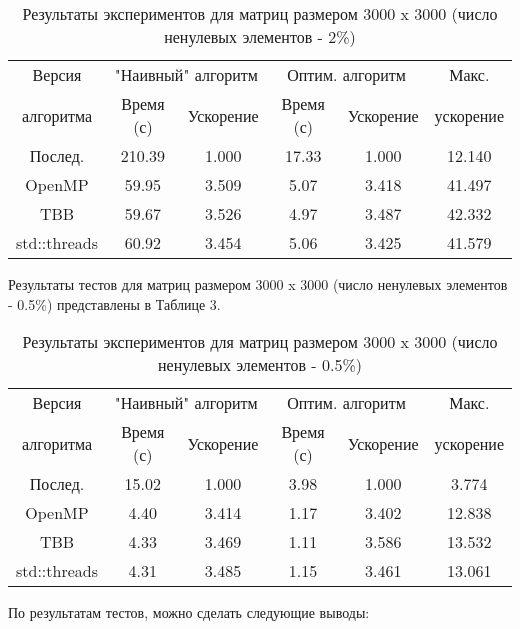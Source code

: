 \documentclass{report}
\begin{document}
	\begin{table}[!h]
		\caption{Результаты экспериментов для матриц размером 3000 x 3000 (число ненулевых элементов - 2\%)}
		\centering
		\begin{tabular}{|c|c|c|c|c|c|}
			\hline
			Версия &
			\multicolumn{2}{|c|}{"Наивный"{} алгоритм} &
			\multicolumn{2}{|c|}{Оптим. алгоритм} &
			Макс. \\
			\cline{2-5}
			алгоритма	&  Время (с)  &  Ускорение  &   Время (с)  &  Ускорение  &  ускорение   \\
			\hline
			Послед.	&	210.39	&	1.000	&	17.33	&	1.000	&	12.140	\\
			\hline
			OpenMP			&	59.95	&	3.509	&	5.07	&	3.418	&	41.497	\\
			\hline
			TBB				&	59.67	&	3.526	&	4.97	&	3.487	&	42.332	\\
			\hline
			std::threads		&	60.92	&	3.454	&	5.06	&	3.425	&	41.579	\\
			\hline
		\end{tabular}
	\end{table}
	\par Результаты тестов для матриц размером 3000 x 3000 (число ненулевых элементов - 0.5\%) представлены в Таблице 3.
	\begin{table}[!h]
		\caption{Результаты экспериментов для матриц размером 3000 x 3000 (число ненулевых элементов - 0.5\%)}
		\centering
		\begin{tabular}{|c|c|c|c|c|c|}
			\hline
			Версия &
			\multicolumn{2}{|c|}{"Наивный"{} алгоритм} &
			\multicolumn{2}{|c|}{Оптим. алгоритм} &
			Макс. \\
			\cline{2-5}
			алгоритма	&  Время (с)  &  Ускорение  &   Время (с)  &  Ускорение  &  ускорение   \\
			\hline
			Послед.	&	15.02	&	1.000	&	3.98	&	1.000	&	3.774	\\
			\hline
			OpenMP			&	4.40	&	3.414	&	1.17	&	3.402	&	12.838	\\
			\hline
			TBB				&	4.33	&	3.469	&	1.11	&	3.586	&	13.532	\\
			\hline
			std::threads		&	4.31	&	3.485	&	1.15	&	3.461	&	13.061	\\
			\hline
		\end{tabular}
	\end{table}
	\par По результатам тестов, можно сделать следующие выводы:
\end{document}
